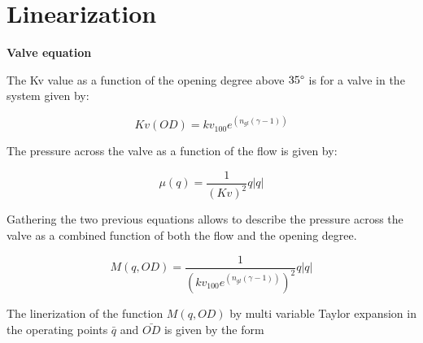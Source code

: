 \chapter{Linearization}
\label{chap:Lin}

\textbf{Valve equation}

The Kv value as a function of the opening degree above $35\degree$ is for a valve in the system given by:

\begin{equation}
	Kv(OD)=kv_{100} e^{(n_{gl} (\gamma-1))}
\end{equation}


The pressure across the valve as a function of the flow is given by:

\begin{equation}
	\mu(q)=\frac{1}{(Kv)^2} q |q|
\end{equation}

Gathering the two previous equations allows to describe the pressure across the valve as a combined function of both the flow and the opening degree.

\begin{equation}
	M(q,OD)=\frac{1}{(kv_{100} e^{(n_{gl} (\gamma-1))})^2} q |q| 
\end{equation}	


The linerization of the function $M(q,OD)$ by multi variable Taylor expansion in the operating points $\bar{q}$ and $\bar{OD}$ is given by the form

